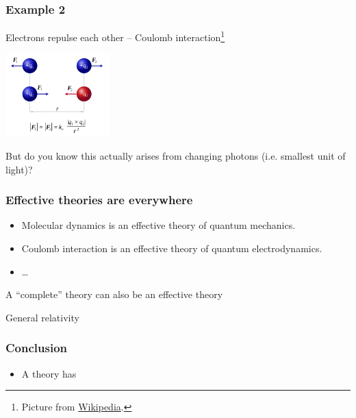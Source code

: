 \documentclass{beamer}
\begin{document}
\begin{frame}
\frametitle{Example 2}

Electrons repulse each other -- Coulomb interaction\footnote{
    Picture from 
    \href{https://en.wikipedia.org/wiki/Coulomb\%27s\_law\#/media/File:CoulombsLaw.svg}{Wikipedia}.
}   

\begin{center}
    \includegraphics[width=0.3\textwidth]{ab-initio/CoulombsLaw.png}
\end{center}

But do you know this actually arises from changing photons (i.e. smallest unit of light)?

\begin{center}
    
\end{center}

\end{frame}

\begin{frame}
\frametitle{Effective theories are everywhere}

\begin{itemize}
    \item Molecular dynamics is an effective theory of quantum mechanics.
    \item Coulomb interaction is an effective theory of quantum electrodynamics.
    \item \dots
\end{itemize}

A ``complete'' theory can also be an effective theory

General relativity  

\end{frame}


\begin{frame}
\frametitle{Conclusion}

\begin{itemize}
    \item A theory has 
\end{itemize}    

\end{frame}
\end{document}
